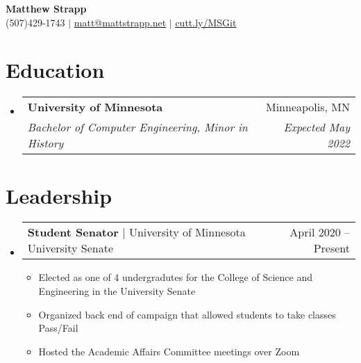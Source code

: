 \documentclass[letterpaper,11pt]{article}
\makeatletter
\newcommand{\resumeItem}[1]{
  \item\small{
    {#1 \vspace{-2pt}}
  }
}
\newcommand{\resumeSubheading}[4]{
  \vspace{-2pt}\item
    \begin{tabular*}{0.97\textwidth}[t]{l@{\extracolsep{\fill}}r}
      \textbf{#1} & #2 \\
      \textit{\small#3} & \textit{\small #4} \\
    \end{tabular*}\vspace{-7pt}
}
\newcommand{\resumeProjectHeading}[2]{
    \item
    \begin{tabular*}{0.97\textwidth}{l@{\extracolsep{\fill}}r}
      \small#1 & #2 \\
    \end{tabular*}\vspace{-7pt}
}
\newcommand{\resumeSubHeadingListStart}{\begin{itemize}[leftmargin=0.15in, label={}]}
\newcommand{\resumeSubHeadingListEnd}{\end{itemize}}
\newcommand{\resumeItemListStart}{\begin{itemize}}
\newcommand{\resumeItemListEnd}{\end{itemize}\vspace{-5pt}}
\makeatother
\begin{document}

\begin{center}
    \textbf{\Huge Matthew Strapp} \\ \vspace{1pt}
    \small (507)429-1743 $|$ \href{mailto:matt@mattstrapp.net}{\underline{matt@mattstrapp.net}} $|$ 
    \href{https://git.mattstrapp.net/RossTheRoss}{\underline{cutt.ly/MSGit}}
\end{center}


\section{Education}
  \resumeSubHeadingListStart
    \resumeSubheading
      {University of Minnesota}{Minneapolis, MN}
      {Bachelor of Computer Engineering, Minor in History}{Expected May 2022}
  \resumeSubHeadingListEnd

\section{Leadership}
    \resumeSubHeadingListStart
        \resumeProjectHeading 
            {\textbf{Student Senator} $|$ University of Minnesota  University Senate}{April 2020 -- Present}
        \resumeItemListStart
            \resumeItem{Elected as one of 4 undergradutes for the College of Science and Engineering in the University Senate}
            \resumeItem{Organized back end of campaign that allowed students to take classes Pass/Fail}
            \resumeItem{Hosted the Academic Affairs Committee meetings over Zoom}
        \resumeItemListEnd
    \resumeSubHeadingListEnd

\end{document}
